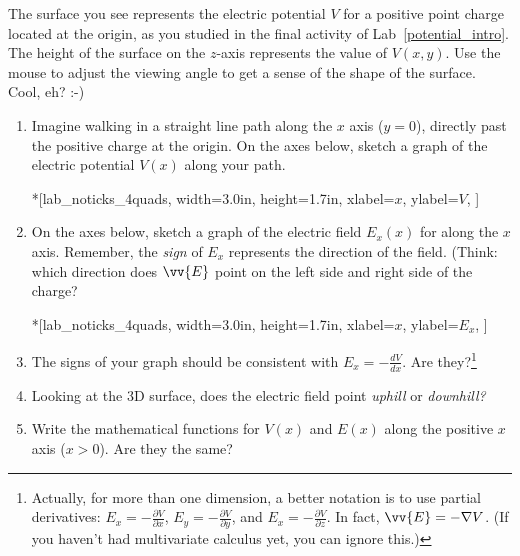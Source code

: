 The surface you see represents the electric potential $V$ for a positive point charge located at the origin, as you studied in the final activity of Lab~\ref{potential_intro}.  The height of the surface on the $z$-axis represents the value of $V(x,y)$.  Use the mouse to adjust the viewing angle to get a sense of the shape of the surface.  Cool, eh?  :-)

\begin{enumerate}[labparts]

\item Imagine walking in a straight line path along the $x$ axis ($y=0$), directly past the positive charge at the origin.  On the axes below, sketch a graph of the electric potential $V(x)$ along your path.  

\begin{lab_axis}*[lab_noticks_4quads,
	width={3.0in}, height={1.7in},
	xlabel=$x$,
	ylabel=$V$,
	]
\end{lab_axis}

\item On the axes below, sketch a graph of the electric field $E_x(x)$ for along the $x$ axis.  Remember, the \textit{sign} of $E_x$ represents the direction of the field.  (Think: which direction does $\vv{E}$ point on the left side and right side of the charge?

\begin{lab_axis}*[lab_noticks_4quads,
	width={3.0in}, height={1.7in},
	xlabel=$x$,
	ylabel=$E_x$,
	]
\end{lab_axis}


\item The signs of your graph should be consistent with 
$\displaystyle E_x=-\frac{dV}{dx}$. Are they?\footnote{Actually, for more than one dimension, a better notation is to use partial derivatives: 
$\displaystyle E_x=-\frac{\partial V}{\partial x}$,  
$\displaystyle E_y=-\frac{\partial V}{\partial y}$, and 
$\displaystyle E_x=-\frac{\partial V}{\partial z}$.
In fact, $\vv{E}=-\nabla V$.  (If you haven't had multivariate calculus yet, you can ignore this.)}
\answerspace{0.3in}

\item Looking at the 3D surface, does the electric field point \textit{uphill} or \textit{downhill?}
\answerspace{0.3in}

\item Write the mathematical functions for $V(x)$ and $E(x)$ along the positive $x$ axis ($x > 0$).  Are they the same?
\answerspace{0.3in}

\end{enumerate}

